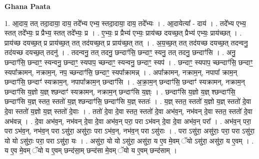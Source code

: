 \documentclass[17pt]{extarticle}
\begin{document}
\textbf{Ghana Paata } \newline

1. आ॒दाय॒ तत् तदा॒दाया॒ दाय॒ तदे᳚भ्य एभ्य॒ स्तदा॒दाया॒ दाय॒ तदे᳚भ्यः । . आ॒दायेत्या᳚ - दाय॑ । . तदे᳚भ्य एभ्य॒ स्तत् तदे᳚भ्यः॒ प्र प्रैभ्य॒ स्तत् तदे᳚भ्यः॒ प्र । . ए॒भ्यः॒ प्र प्रैभ्य॑ एभ्यः॒ प्राय॑च्छ दयच्छ॒त् प्रैभ्य॑ एभ्यः॒ प्राय॑च्छत् । . प्राय॑च्छ दयच्छ॒त् प्र प्राय॑च्छ॒त् तत् तद॑यच्छ॒त् प्र प्राय॑च्छ॒त् तत् । . अ॒य॒च्छ॒त् तत् तद॑यच्छ दयच्छ॒त् तदन्वनु॒ तद॑यच्छ दयच्छ॒त् तदनु॑ । . तदन्वनु॒ तत् तदनु॒ छन्दाꣳ॑सि॒ छन्दाꣳ॒॒ स्यनु॒ तत् तदनु॒ छन्दाꣳ॑सि । . अनु॒ छन्दाꣳ॑सि॒ छन्दाꣳ॒॒ स्यन्वनु॒ छन्दाꣳ॒॒ स्यपाप॒ च्छन्दाꣳ॒॒ स्यन्वनु॒ छन्दाꣳ॒॒ स्यप॑ । . छन्दाꣳ॒॒ स्यपाप॒ च्छन्दाꣳ॑सि॒ छन्दाꣳ॒॒ स्यपा᳚क्रामन्, नक्राम॒न्, नप॒ च्छन्दाꣳ॑सि॒ छन्दाꣳ॒॒ स्यपा᳚क्रामन्न् । . अपा᳚क्रामन्, नक्राम॒न्, नपापा᳚ क्राम॒न् छन्दाꣳ॑सि॒ छन्दाꣳ॑ स्यक्राम॒न्, नपापा᳚क्राम॒न् छन्दाꣳ॑सि । . अ॒क्रा॒म॒न् छन्दाꣳ॑सि॒ छन्दाꣳ॑ स्यक्रामन्, नक्राम॒न् छन्दाꣳ॑सि य॒ज्ञो य॒ज्ञ् श्छन्दाꣳ॑ स्यक्रामन्, नक्राम॒न् छन्दाꣳ॑सि य॒ज्ञ्ः । . छन्दाꣳ॑सि य॒ज्ञो य॒ज्ञ् श्छन्दाꣳ॑सि॒ छन्दाꣳ॑सि य॒ज्ञ् स्तत॒ स्ततो॑ य॒ज्ञ् श्छन्दाꣳ॑सि॒ छन्दाꣳ॑सि य॒ज्ञ् स्ततः॑ । . य॒ज्ञ् स्तत॒ स्ततो॑ य॒ज्ञो य॒ज्ञ् स्ततो॑ दे॒वा दे॒वा स्ततो॑ य॒ज्ञो य॒ज्ञ् स्ततो॑ दे॒वाः । . ततो॑ दे॒वा दे॒वा स्तत॒ स्ततो॑ दे॒वा अभ॑व॒न्, नभ॑वन् दे॒वा स्तत॒ स्ततो॑ दे॒वा अभ॑वन्न् । . दे॒वा अभ॑व॒न्, नभ॑वन् दे॒वा दे॒वा अभ॑व॒न् परा॒ परा ऽभ॑वन् दे॒वा दे॒वा अभ॑व॒न् परा᳚ । . अभ॑व॒न् परा॒ परा ऽभ॑व॒न्, नभ॑व॒न् परा ऽसु॑रा॒ असु॑राः॒ परा ऽभ॑व॒न्, नभ॑व॒न् परा ऽसु॑राः । . परा ऽसु॑रा॒ असु॑राः॒ परा॒ परा ऽसु॑रा॒ यो यो ऽसु॑राः॒ परा॒ परा ऽसु॑रा॒ यः । . असु॑रा॒ यो यो ऽसु॑रा॒ असु॑रा॒ य ए॒व मे॒वम् ॅयो ऽसु॑रा॒ असु॑रा॒ य ए॒वम् । . य ए॒व मे॒वम् ॅयो य ए॒वम् छन्द॑सा॒म् छन्द॑सा मे॒वम् ॅयो य ए॒वम् छन्द॑साम् । \newline
\end{document}
